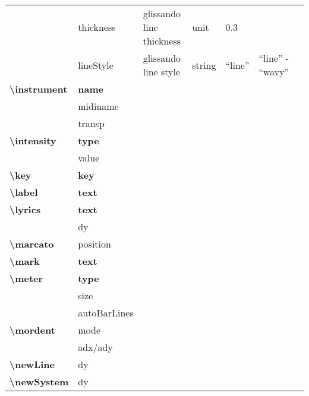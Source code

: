 \documentclass[a4paper, landscape, 10pt]{article}
\begin{document}
\begin{tabularx}{\linewidth}{p{3cm}p{2cm}p{5cm}p{3cm}p{3.5cm}p{3.5cm}p{4cm}}
    &thickness&glissando line thickness&unit&0.3&&\\
    &lineStyle&glissando line style&string&``line''&``line'' - ``wavy''&\\ %
    \hline
    \textbf{\textbackslash{}instrument}&\textbf{name}&&&&&\\
    &midiname&&&&&\\
    &transp&&&&&\\
    \hline
    \textbf{\textbackslash{}intensity}&\textbf{type}&&&&&\\
    &value&&&&&\\
    \hline
    \textbf{\textbackslash{}key}&\textbf{key}&&&&&\\
    \hline
    \textbf{\textbackslash{}label}&\textbf{text}&&&&&\\
    \hline
    \textbf{\textbackslash{}lyrics}&\textbf{text}&&&&&\\
    &dy&&&&&\\
    \hline
    \textbf{\textbackslash{}marcato}&position&&&&&\\
    \hline
    \textbf{\textbackslash{}mark}&\textbf{text}&&&&&\\
    \hline
    \textbf{\textbackslash{}meter}&\textbf{type}&&&&&\\
    &size&&&&&\\
    &autoBarLines&&&&&\\
    \hline
    \textbf{\textbackslash{}mordent}&mode&&&&&\\
    &adx/ady&&&&&\\
    \hline
    \textbf{\textbackslash{}newLine}&dy&&&&&\\
    \hline
    \textbf{\textbackslash{}newSystem}&dy&&&&&\\
    \hline
\end{tabularx}
\end{document}
